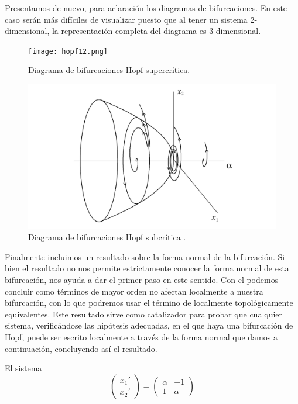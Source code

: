 \begin{enumerate}
	Presentamos de nuevo, para aclaración los diagramas de bifurcaciones. En este caso serán más difíciles de visualizar puesto que al tener un sistema 2-dimensional, la representación completa del diagrama es 3-dimensional.

\begin{figure}[H]
	\centering
	\texttt{[image: hopf12.png]}
	\caption{Diagrama de bifurcaciones Hopf supercrítica\cite{Kuznet}. }
\label{hopf3}
\end{figure}
\begin{figure}[H]
	\centering
	\includegraphics[width=\textwidth]{hopf22.png}
	\caption{Diagrama de bifurcaciones Hopf subcrítica \cite{Kuznet}. }
\label{hopf4}
\end{figure}
	Finalmente incluimos un resultado sobre la forma normal de la bifurcación. Si bien el resultado no nos permite estrictamente conocer la forma normal de esta bifurcación, nos ayuda a dar el primer paso en este sentido. Con el podemos concluir como términos de mayor orden no afectan localmente a nuestra bifurcación, con lo que podremos usar el término de localmente topológicamente equivalentes. Este resultado sirve como catalizador para probar que cualquier sistema, verificándose las hipótesis adecuadas, en el que haya una bifurcación de Hopf, puede ser escrito localmente a través de la forma normal que damos a continuación, concluyendo así el resultado.
	\begin{lemma}
		El sistema 
		\begin{equation}
		\begin{pmatrix}
		x_1' \\
		x_2'
		\end{pmatrix}
		=
		\begin{pmatrix}
		\alpha & -1\\
		1 & \alpha
		\end{pmatrix}

\end{equation}
\end{lemma}
\end{enumerate}
